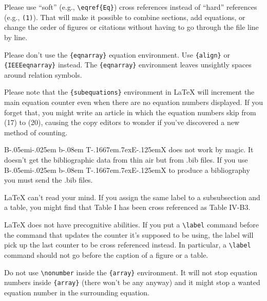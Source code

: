 \documentclass[conference, one column]{IEEEtran}
\def\BibTeX{{\rm B\kern-.05em{\sc i\kern-.025em b}\kern-.08em
    T\kern-.1667em\lower.7ex\hbox{E}\kern-.125emX}}
\begin{document}
Please use ``soft'' (e.g., \verb|\eqref{Eq}|) cross references instead
of ``hard'' references (e.g., \verb|(1)|). That will make it possible
to combine sections, add equations, or change the order of figures or
citations without having to go through the file line by line.

Please don't use the \verb|{eqnarray}| equation environment. Use
\verb|{align}| or \verb|{IEEEeqnarray}| instead. The \verb|{eqnarray}|
environment leaves unsightly spaces around relation symbols.

Please note that the \verb|{subequations}| environment in {\LaTeX}
will increment the main equation counter even when there are no
equation numbers displayed. If you forget that, you might write an
article in which the equation numbers skip from (17) to (20), causing
the copy editors to wonder if you've discovered a new method of
counting.

{\BibTeX} does not work by magic. It doesn't get the bibliographic
data from thin air but from .bib files. If you use {\BibTeX} to produce a
bibliography you must send the .bib files. 

{\LaTeX} can't read your mind. If you assign the same label to a
subsubsection and a table, you might find that Table I has been cross
referenced as Table IV-B3. 

{\LaTeX} does not have precognitive abilities. If you put a
\verb|\label| command before the command that updates the counter it's
supposed to be using, the label will pick up the last counter to be
cross referenced instead. In particular, a \verb|\label| command
should not go before the caption of a figure or a table.

Do not use \verb|\nonumber| inside the \verb|{array}| environment. It
will not stop equation numbers inside \verb|{array}| (there won't be
any anyway) and it might stop a wanted equation number in the
surrounding equation.
\end{document}
